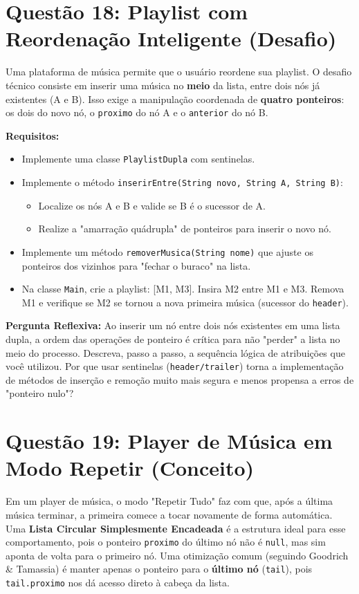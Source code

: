 \documentclass[12pt, a4paper]{article}
\begin{document}
\section*{Questão 18: Playlist com Reordenação Inteligente (Desafio)}
Uma plataforma de música permite que o usuário reordene sua playlist. O desafio técnico consiste em inserir uma música no \textbf{meio} da lista, entre dois nós já existentes (A e B). Isso exige a manipulação coordenada de \textbf{quatro ponteiros}: os dois do novo nó, o \texttt{proximo} do nó A e o \texttt{anterior} do nó B.

\textbf{Requisitos:}
\begin{itemize}
    \item Implemente uma classe \texttt{PlaylistDupla} com sentinelas.
    \item Implemente o método \texttt{inserirEntre(String novo, String A, String B)}:
    \begin{itemize}
        \item Localize os nós A e B e valide se B é o sucessor de A.
        \item Realize a "amarração quádrupla" de ponteiros para inserir o novo nó.
    \end{itemize}
    \item Implemente um método \texttt{removerMusica(String nome)} que ajuste os ponteiros dos vizinhos para "fechar o buraco" na lista.
    \item Na classe \texttt{Main}, crie a playlist: [M1, M3]. Insira M2 entre M1 e M3. Remova M1 e verifique se M2 se tornou a nova primeira música (sucessor do \texttt{header}).
\end{itemize}

\textbf{Pergunta Reflexiva:} Ao inserir um nó entre dois nós existentes em uma lista dupla, a ordem das operações de ponteiro é crítica para não "perder" a lista no meio do processo. Descreva, passo a passo, a sequência lógica de atribuições que você utilizou. Por que usar sentinelas (\texttt{header/trailer}) torna a implementação de métodos de inserção e remoção muito mais segura e menos propensa a erros de "ponteiro nulo"?

\section*{Questão 19: Player de Música em Modo Repetir (Conceito)}
Em um player de música, o modo "Repetir Tudo" faz com que, após a última música terminar, a primeira comece a tocar novamente de forma automática. Uma \textbf{Lista Circular Simplesmente Encadeada} é a estrutura ideal para esse comportamento, pois o ponteiro \texttt{proximo} do último nó não é \texttt{null}, mas sim aponta de volta para o primeiro nó. Uma otimização comum (seguindo Goodrich \& Tamassia) é manter apenas o ponteiro para o \textbf{último nó} (\texttt{tail}), pois \texttt{tail.proximo} nos dá acesso direto à cabeça da lista.
\end{document}
